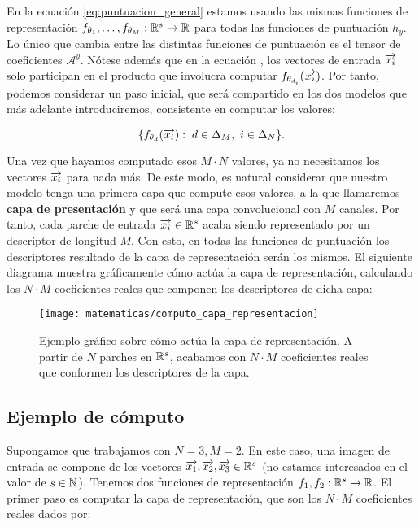 En la ecuación \eqref{eq:puntuacion_general} estamos usando las mismas funciones de representación $f_{\theta_1}, \ldots, f_{\theta_M}: \mathbb{R}^s \to \mathbb{R}$ para todas las funciones de puntuación $h_y$. Lo único que cambia entre las distintas funciones de puntuación es el tensor de coeficientes $\mathcal{A}^y$. Nótese además que en la ecuación , los vectores de entrada $\overrightarrow{x_i}$ solo participan en el producto que involucra computar $f_{\theta_{d_i}}(\overrightarrow{x_i})$. Por tanto, podemos considerar un paso inicial, que será compartido en los dos modelos que más adelante introduciremos, consistente en computar los valores:

$$\{f_{\theta_d}(\overrightarrow{x_i}): \; d \in \Delta_{M},\ i \in \Delta_{N} \}.$$

Una vez que hayamos computado esos $M \cdot N$ valores, ya no necesitamos los vectores $\overrightarrow{x_i}$ para nada más. De este modo, es natural considerar que nuestro modelo tenga una primera capa que compute esos valores, a la que llamaremos \textbf{capa de presentación} y que será una capa convolucional con $M$ canales. Por tanto, cada parche de entrada $\overrightarrow{x_i} \in \mathbb{R}^s$ acaba siendo representado por un descriptor de longitud $M$. Con esto, en todas las funciones de puntuación los descriptores resultado de la capa de representación serán los mismos. El siguiente diagrama muestra gráficamente cómo actúa la capa de representación, calculando los $N \cdot M$ coeficientes reales que componen los descriptores de dicha capa:

\begin{figure}[!hbtp]
	\centering
	\texttt{[image: matematicas/computo\_capa\_representacion]}
	\caption{Ejemplo gráfico sobre cómo actúa la capa de representación. A partir de $N$ parches en $\mathbb{R}^s$, acabamos con $N \cdot M$ coeficientes reales que conformen los descriptores de la capa.}
\end{figure}

\subsection{Ejemplo de cómputo} \label{ejemplo:funcion_puntuacion}

Supongamos que trabajamos con $N = 3, M = 2$. En este caso, una imagen de entrada se compone de los vectores $\overrightarrow{x_1}, \overrightarrow{x_2}, \overrightarrow{x_3} \in \mathbb{R}^s$ (no estamos interesados en el valor de $s \in \mathbb{N}$). Tenemos dos funciones de representación $f_1, f_2: \mathbb{R}^s \to \mathbb{R}$. El primer paso es computar la capa de representación, que son los $N \cdot M$ coeficientes reales dados por:

